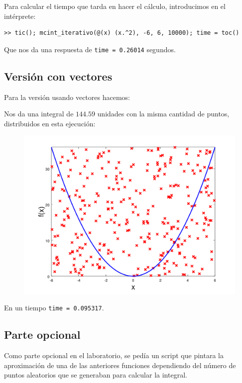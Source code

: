 \documentclass{article}
\begin{document}
Para calcular el tiempo que tarda en hacer el cálculo, introducimos en 
el intérprete:
\begin{lstlisting}[style=snippet]
>> tic(); mcint_iterativo(@(x) (x.^2), -6, 6, 10000); time = toc()
\end{lstlisting}
Que nos da una respuesta de {\tt time =  0.26014} segundos.

\subsection{Versión con vectores}
Para la versión usando vectores hacemos:


Nos da una integral de $144.59$ unidades con la misma cantidad de 
puntos, distribuidos en esta ejecución:
\begin{figure}[h]
\centering
\includegraphics[width=12cm]{vector}
\end{figure}
En un tiempo {\tt time =  0.095317}.
\pagebreak

\subsection{Parte opcional}
Como parte opcional en el laboratorio, se pedía un script que pintara la 
aproximación de una de las anteriores funciones dependiendo del número 
de puntos aleatorios que se generaban para calcular la integral.
\end{document}

